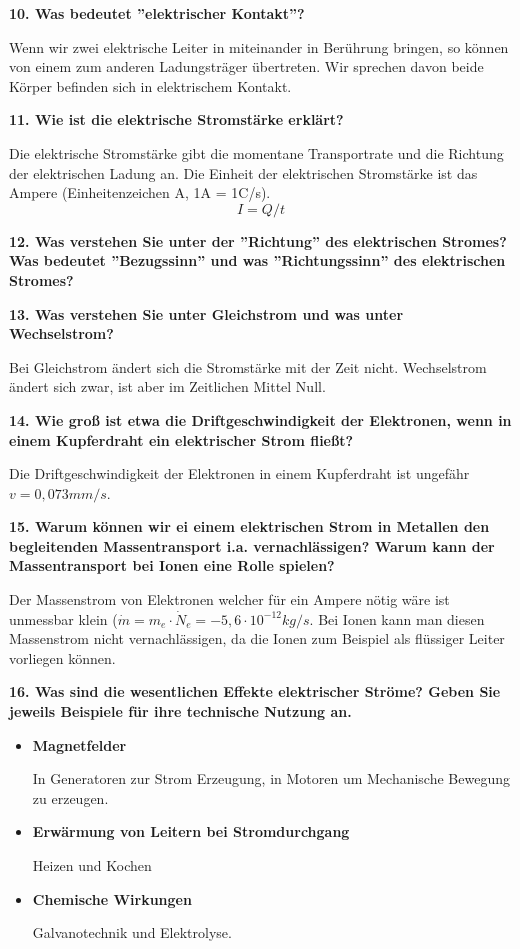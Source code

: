 \documentclass[12pt,a4paper,twoside]{book}
\newcommand{\nqu}[1]{\vspace*{10mm} \noindent \textbf{#1} \par \vspace*{1mm}}
\begin{document}
\nqu{10. Was bedeutet ''elektrischer Kontakt''?}
Wenn wir zwei elektrische Leiter in miteinander in Berührung bringen, so können von einem zum anderen Ladungsträger übertreten. Wir sprechen davon beide Körper befinden sich in elektrischem Kontakt. 

\nqu{11. Wie ist die elektrische Stromstärke erklärt?}
Die elektrische Stromstärke gibt die momentane Transportrate und die Richtung der elektrischen Ladung an. Die Einheit der elektrischen Stromstärke ist das Ampere (Einheitenzeichen A, 1A = 1C/s).
\[I=Q/t\]


\nqu{12. Was verstehen Sie unter der ''Richtung'' des elektrischen Stromes? Was bedeutet ''Bezugssinn'' und was ''Richtungssinn'' des elektrischen Stromes?}

\nqu{13. Was verstehen Sie unter Gleichstrom und was unter Wechselstrom?}
Bei Gleichstrom ändert sich die Stromstärke mit der Zeit nicht.
Wechselstrom ändert sich zwar, ist aber im Zeitlichen Mittel Null.

\nqu{14. Wie groß ist etwa die Driftgeschwindigkeit der Elektronen, wenn in einem Kupferdraht ein elektrischer Strom fließt?}
Die Driftgeschwindigkeit der Elektronen in einem Kupferdraht ist ungefähr $v=0,073 mm/s$.

\nqu{15. Warum können wir ei einem elektrischen Strom in Metallen den begleitenden Massentransport i.a. vernachlässigen? Warum kann der Massentransport bei Ionen eine Rolle spielen?}
Der Massenstrom von Elektronen welcher für ein Ampere nötig wäre ist unmessbar klein ($\dot{m}=m_e\cdot \dot{N}_e=-5,6\cdot 10^{-12}kg/s$.
Bei Ionen kann man diesen Massenstrom nicht vernachlässigen, da die Ionen zum Beispiel als flüssiger Leiter vorliegen können.

\nqu{16. Was sind die wesentlichen Effekte elektrischer Ströme? Geben Sie jeweils Beispiele für ihre technische Nutzung an.}
\begin{itemize}
\item \textbf{Magnetfelder}

In Generatoren zur Strom Erzeugung, in Motoren um Mechanische Bewegung zu erzeugen.

\item \textbf{Erwärmung von Leitern bei Stromdurchgang}

Heizen und Kochen

\item \textbf{Chemische Wirkungen}

Galvanotechnik und Elektrolyse.

\end{itemize}
\end{document}
